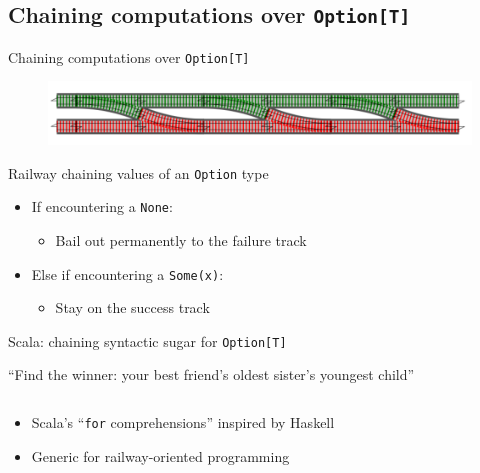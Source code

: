 \subsection{Chaining computations over \texttt{Option[T]}}

\begin{frame}{Chaining computations over \texttt{Option[T]}}
  \begin{figure}
    \includegraphics[width=\textwidth]{Recipe_RailwaySwitch3.png}
  \end{figure}
  \begin{example}{Railway chaining values of an \texttt{Option} type}
    \begin{itemize}
    \item If encountering a \texttt{None}:
      \begin{itemize}
      \item Bail out permanently to the failure track
      \end{itemize}
    \item Else if encountering a \texttt{Some(x)}:
      \begin{itemize}
      \item Stay on the success track
      \end{itemize}
    \end{itemize}
  \end{example}
\end{frame}

\begin{frame}{Scala: chaining syntactic sugar for \texttt{Option[T]}}
  \begin{example}{``Find the winner: your best friend's oldest sister's
      youngest child''}
    \inputminted{scala}{OptionWinner.scala}
  \end{example}

  \begin{itemize}
  \item Scala's ``\texttt{for} comprehensions'' inspired by Haskell
  \item Generic for railway-oriented programming
  \end{itemize}
\end{frame}

